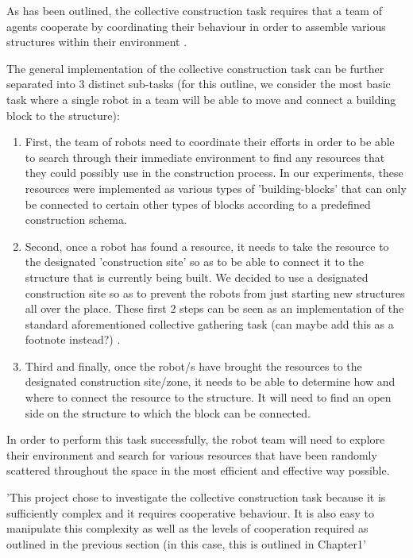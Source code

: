 As has been outlined, the collective construction task requires that a team of agents cooperate by coordinating their behaviour in order to assemble various structures within their environment \cite{NitschkeSaEC2012}.

The general implementation of the collective construction task can be further separated into 3 distinct sub-tasks (for this outline, we consider the most basic task where a single robot in a team will be able to move and connect a building block to the structure):
\begin{enumerate}
	\item First, the team of robots need to coordinate their efforts in order to be able to search through their immediate environment to find any resources that they could possibly use in the construction process. In our experiments, these resources were implemented as various types of 'building-blocks' that can only be connected to certain other types of blocks according to a predefined construction schema.
	\item Second, once a robot has found a resource, it needs to take the resource to the designated 'construction site' so as to be able to connect it to the structure that is currently being built. We decided to use a designated construction site so as to prevent the robots from just starting new structures all over the place. These first 2 steps can be seen as an implementation of the standard aforementioned collective gathering task (can maybe add this as a footnote instead?) \cite{NitschkeSaEC2012}.
	\item Third and finally, once the robot/s have brought the resources to the designated construction site/zone, it needs to be able to determine how and where to connect the resource to the structure. It will need to find an open side on the structure to which the block can be connected.
\end{enumerate}

In order to perform this task successfully, the robot team will need to explore their environment and search for various resources that have been randomly scattered throughout the space in the most efficient and effective way possible.

'This project chose to investigate the collective construction task because it is sufficiently complex and it requires cooperative behaviour. It is also easy to manipulate this complexity as well as the levels of cooperation required as outlined in the previous section (in this case, this is outlined in Chapter1'

